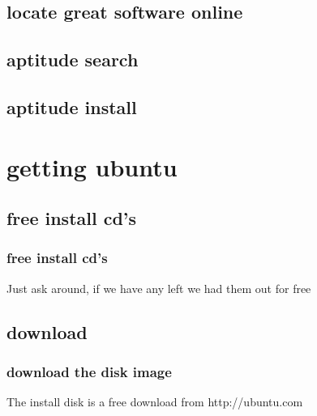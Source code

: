\documentclass[hyperref={pdfpagelabels=false}]{beamer}
\begin{document}
\subsection{locate great software online}
\subsection{aptitude search}
\subsection{aptitude install}
\section{getting ubuntu}
\subsection{free install cd's}
\frame
{
    \frametitle{free install cd's}
    Just ask around, if we have any left we had them out for free
}
\subsection{download}
\frame
{
    \frametitle{download the disk image}
    The install disk is a free download from http://ubuntu.com
}
\end{document}
